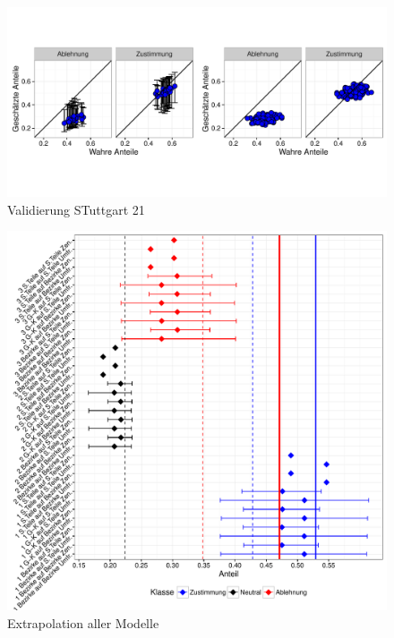 \documentclass{Vorlage}
\begin{document}
\begin{figure}[h]
 \begin{center}
 \includegraphics[scale=0.8]{Pictures/PaT}
 \caption{Validierung STuttgart 21}
 \label{vali}
 \end{center}
\end{figure}

\begin{figure}[h]
 \begin{center}
 \includegraphics[scale=0.8]{Pictures/S21AlleModelle}
 \caption{Extrapolation aller Modelle}
 \label{S21Alle}
 \end{center}
\end{figure}

\end{document}
